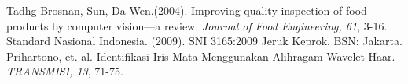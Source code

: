 \documentclass[laporan.tex]{subfiles}
\begin{document}
\begin{thebibliography}{99}
 Tadhg Brosnan, Sun, Da-Wen.(2004). Improving quality inspection of food products by computer vision––a review. \emph{Journal of Food Engineering, 61}, 3-16.
 Standard Nasional Indonesia. (2009). SNI 3165:2009 Jeruk Keprok. BSN: Jakarta.
 Prihartono, et. al. Identifikasi Iris Mata Menggunakan Alihragam Wavelet Haar.  \emph{TRANSMISI, 13}, 71-75.
\end{thebibliography}
\end{document}
